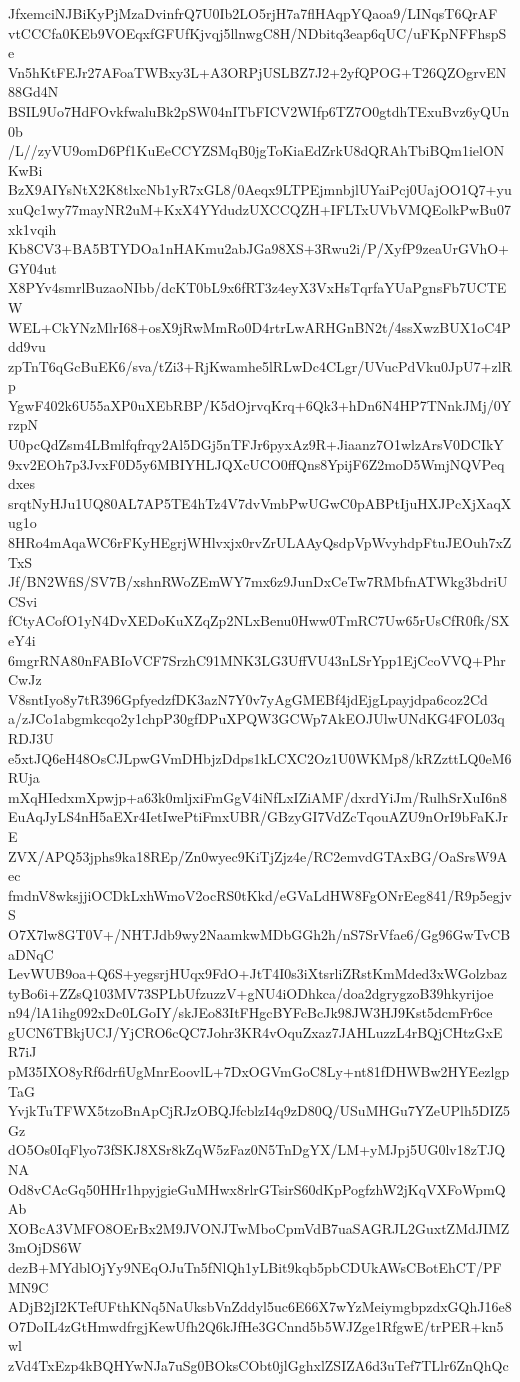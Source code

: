 JfxemciNJBiKyPjMzaDvinfrQ7U0Ib2LO5rjH7a7flHAqpYQaoa9/LINqsT6QrAF
vtCCCfa0KEb9VOEqxfGFUfKjvqj5llnwgC8H/NDbitq3eap6qUC/uFKpNFFhspSe
Vn5hKtFEJr27AFoaTWBxy3L+A3ORPjUSLBZ7J2+2yfQPOG+T26QZOgrvEN88Gd4N
BSIL9Uo7HdFOvkfwaluBk2pSW04nITbFICV2WIfp6TZ7O0gtdhTExuBvz6yQUn0b
/L//zyVU9omD6Pf1KuEeCCYZSMqB0jgToKiaEdZrkU8dQRAhTbiBQm1ielONKwBi
BzX9AIYsNtX2K8tlxcNb1yR7xGL8/0Aeqx9LTPEjmnbjlUYaiPcj0UajOO1Q7+yu
xuQc1wy77mayNR2uM+KxX4YYdudzUXCCQZH+IFLTxUVbVMQEolkPwBu07xk1vqih
Kb8CV3+BA5BTYDOa1nHAKmu2abJGa98XS+3Rwu2i/P/XyfP9zeaUrGVhO+GY04ut
X8PYv4smrlBuzaoNIbb/dcKT0bL9x6fRT3z4eyX3VxHsTqrfaYUaPgnsFb7UCTEW
WEL+CkYNzMlrI68+osX9jRwMmRo0D4rtrLwARHGnBN2t/4ssXwzBUX1oC4Pdd9vu
zpTnT6qGcBuEK6/sva/tZi3+RjKwamhe5lRLwDc4CLgr/UVucPdVku0JpU7+zlRp
YgwF402k6U55aXP0uXEbRBP/K5dOjrvqKrq+6Qk3+hDn6N4HP7TNnkJMj/0YrzpN
U0pcQdZsm4LBmlfqfrqy2Al5DGj5nTFJr6pyxAz9R+Jiaanz7O1wlzArsV0DCIkY
9xv2EOh7p3JvxF0D5y6MBIYHLJQXcUCO0ffQns8YpijF6Z2moD5WmjNQVPeqdxes
srqtNyHJu1UQ80AL7AP5TE4hTz4V7dvVmbPwUGwC0pABPtIjuHXJPcXjXaqXug1o
8HRo4mAqaWC6rFKyHEgrjWHlvxjx0rvZrULAAyQsdpVpWvyhdpFtuJEOuh7xZTxS
Jf/BN2WfiS/SV7B/xshnRWoZEmWY7mx6z9JunDxCeTw7RMbfnATWkg3bdriUCSvi
fCtyACofO1yN4DvXEDoKuXZqZp2NLxBenu0Hww0TmRC7Uw65rUsCfR0fk/SXeY4i
6mgrRNA80nFABIoVCF7SrzhC91MNK3LG3UffVU43nLSrYpp1EjCcoVVQ+PhrCwJz
V8sntIyo8y7tR396GpfyedzfDK3azN7Y0v7yAgGMEBf4jdEjgLpayjdpa6coz2Cd
a/zJCo1abgmkcqo2y1chpP30gfDPuXPQW3GCWp7AkEOJUlwUNdKG4FOL03qRDJ3U
e5xtJQ6eH48OsCJLpwGVmDHbjzDdps1kLCXC2Oz1U0WKMp8/kRZzttLQ0eM6RUja
mXqHIedxmXpwjp+a63k0mljxiFmGgV4iNfLxIZiAMF/dxrdYiJm/RulhSrXuI6n8
EuAqJyLS4nH5aEXr4IetIwePtiFmxUBR/GBzyGI7VdZcTqouAZU9nOrI9bFaKJrE
ZVX/APQ53jphs9ka18REp/Zn0wyec9KiTjZjz4e/RC2emvdGTAxBG/OaSrsW9Aec
fmdnV8wksjjiOCDkLxhWmoV2ocRS0tKkd/eGVaLdHW8FgONrEeg841/R9p5egjvS
O7X7lw8GT0V+/NHTJdb9wy2NaamkwMDbGGh2h/nS7SrVfae6/Gg96GwTvCBaDNqC
LevWUB9oa+Q6S+yegsrjHUqx9FdO+JtT4I0s3iXtsrliZRstKmMded3xWGolzbaz
tyBo6i+ZZsQ103MV73SPLbUfzuzzV+gNU4iODhkca/doa2dgrygzoB39hkyrijoe
n94/lA1ihg092xDc0LGoIY/skJEo83ItFHgcBYFcBcJk98JW3HJ9Kst5dcmFr6ce
gUCN6TBkjUCJ/YjCRO6cQC7Johr3KR4vOquZxaz7JAHLuzzL4rBQjCHtzGxER7iJ
pM35IXO8yRf6drfiUgMnrEoovlL+7DxOGVmGoC8Ly+nt81fDHWBw2HYEezlgpTaG
YvjkTuTFWX5tzoBnApCjRJzOBQJfcblzI4q9zD80Q/USuMHGu7YZeUPlh5DIZ5Gz
dO5Os0IqFlyo73fSKJ8XSr8kZqW5zFaz0N5TnDgYX/LM+yMJpj5UG0lv18zTJQNA
Od8vCAcGq50HHr1hpyjgieGuMHwx8rlrGTsirS60dKpPogfzhW2jKqVXFoWpmQAb
XOBcA3VMFO8OErBx2M9JVONJTwMboCpmVdB7uaSAGRJL2GuxtZMdJIMZ3mOjDS6W
dezB+MYdblOjYy9NEqOJuTn5fNlQh1yLBit9kqb5pbCDUkAWsCBotEhCT/PFMN9C
ADjB2jI2KTefUFthKNq5NaUksbVnZddyl5uc6E66X7wYzMeiymgbpzdxGQhJ16e8
O7DoIL4zGtHmwdfrgjKewUfh2Q6kJfHe3GCnnd5b5WJZge1RfgwE/trPER+kn5wl
zVd4TxEzp4kBQHYwNJa7uSg0BOksCObt0jlGghxlZSIZA6d3uTef7TLlr6ZnQhQc
